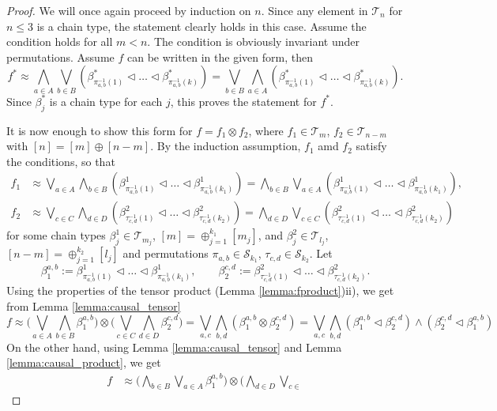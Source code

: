 \documentclass[12pt]{article}
\theoremstyle{definition}
\theoremstyle{remark}
\def\Te{\mathcal T}
\def\permut{\mathscr{S}}
\def\vtl{\vartriangleleft}
\begin{document}
\begin{proof} We will once again proceed by induction on $n$. Since any element in $\Te_n$
for $n\le 3$ is a chain type, the statement clearly holds in this case. Assume the
condition holds for all $m<n$. The condition is obviously invariant under permutations. 
Assume $f$ can be written in the given form, then
\[
f^*\approx \bigwedge _{a\in A}\bigvee_{b\in B} (\beta^*_{\pi^{-1}_{a,b}(1)}\vtl \dots \vtl
\beta^*_{\pi^{-1}_{a,b}(k)})=\bigvee_{b\in B}\bigwedge_{a\in A} (\beta^*_{\pi^{-1}_{a,b}(1)}\vtl \dots \vtl
\beta^*_{\pi^{-1}_{a,b}(k)}).
\]
Since $\beta_j^*$ is a chain type for each $j$, this proves the statement for $f^*$. 

It is now enough to show this form for  $f=f_1\otimes f_2$, where 
$f_1\in \Te_m$, $f_2\in \Te_{n-m}$ with $[n]=[m]\oplus[n-m]$. By the induction assumption,
$f_1$ amd $f_2$ satisfy the conditions, so that
\begin{align*}
f_1&\approx\bigvee_{a\in A}\bigwedge_{b\in B} (\beta^1_{\pi^{-1}_{a,b}(1)}\vtl \dots \vtl
\beta^1_{\pi^{-1}_{a,b}(k_1)})=\bigwedge_{b\in B}\bigvee_{a\in A} (\beta^1_{\pi^{-1}_{a,b}(1)}\vtl \dots \vtl
\beta^1_{\pi^{-1}_{a,b}(k_1)}),\\
f_2&\approx\bigvee_{c\in C}\bigwedge_{d\in D} (\beta^2_{\tau^{-1}_{c,d}(1)}\vtl \dots \vtl
\beta^2_{\tau^{-1}_{c,d}(k_2)})=\bigwedge_{d\in D} \bigvee_{c\in C}(\beta^2_{\tau^{-1}_{c,d}(1)}\vtl \dots \vtl
\beta^2_{\tau^{-1}_{c,d}(k_2)})
\end{align*}
for some chain types  $\beta^1_j\in \Te_{m_j}$, $[m]=\oplus^{k_1}_{j=1}[m_j]$, and $\beta^2_j\in \Te_{l_j}$,
$[n-m]=\oplus_{j=1}^{k_2}[l_j]$ and permutations $\pi_{a,b}\in \permut_{k_1}$, $\tau_{c,d}\in
\permut_{k_2}$.
Let 
\[
\beta^{a,b}_1:=\beta^1_{\pi^{-1}_{a,b}(1)}\vtl \dots \vtl
\beta^1_{\pi^{-1}_{a,b}(k_1)},\qquad \beta^{c,d}_2:= \beta^2_{\tau^{-1}_{c,d}(1)}\vtl \dots \vtl
\beta^2_{\tau^{-1}_{c,d}(k_2)}.
\]
Using the   properties of the tensor product (Lemma \ref{lemma:fproduct})ii), we get from
Lemma \ref{lemma:causal_tensor}
\[
f\approx \bigl(\bigvee_{a\in A}\bigwedge_{b\in B}\beta_1^{a,b}\bigr)\otimes \bigl(\bigvee_{c\in
C}\bigwedge_{d\in D}\beta_2^{c,d}\bigr)=\bigvee_{a,c}\bigwedge_{b,d}
(\beta_1^{a,b}\otimes \beta_2^{c,d})=\bigvee_{a,c}\bigwedge_{b,d}(\beta_1^{a,b}\vtl
\beta_2^{c,d})\wedge (\beta_2^{c,d}\vtl \beta_1^{a,b})
\]
On the other hand, using Lemma \ref{lemma:causal_tensor} and Lemma
\ref{lemma:causal_product}, we
get
\begin{align*}
f&\approx \bigl(\bigwedge_{b\in B}\bigvee_{a\in A}\beta_1^{a,b}\bigr)\otimes \bigl(\bigwedge_{d\in D}\bigvee_{c\in
}
\end{align*}
\end{proof}
\end{document}
